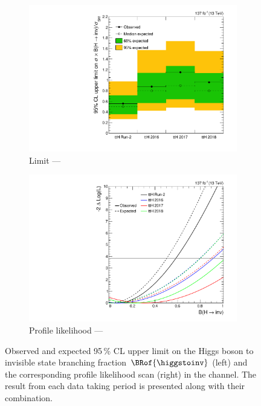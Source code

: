 \begin{figure}[htbp]
    \centering
    \begin{subfigure}[t]{0.49\textwidth}    %
        \includegraphics[width=\textwidth]{figures/limits/ttH/limit_Run2_ttH.pdf}
        \caption{Limit --- \ttH}
    \end{subfigure}
    \hfill
    \begin{subfigure}[t]{0.49\textwidth}
        \includegraphics[width=\textwidth]{figures/likelihood_scan/profile_likelihood_scan_Run2_ttH.pdf}
        \caption{Profile likelihood --- \ttH}
    \end{subfigure}
    \caption[Observed and expected 95\,\% CL upper limit on the Higgs boson to invisible state branching fraction $\BRof{\higgstoinv}$ (left) and the corresponding profile likelihood scan (right) in the \ttH channel]{Observed and expected 95\,\% CL upper limit on the Higgs boson to invisible state branching fraction $\BRof{\higgstoinv}$ (left) and the corresponding profile likelihood scan (right) in the \ttH channel. The result from each data taking period is presented along with their combination.}
    \label{fig:htoinv_limit_ttH}
\end{figure}


